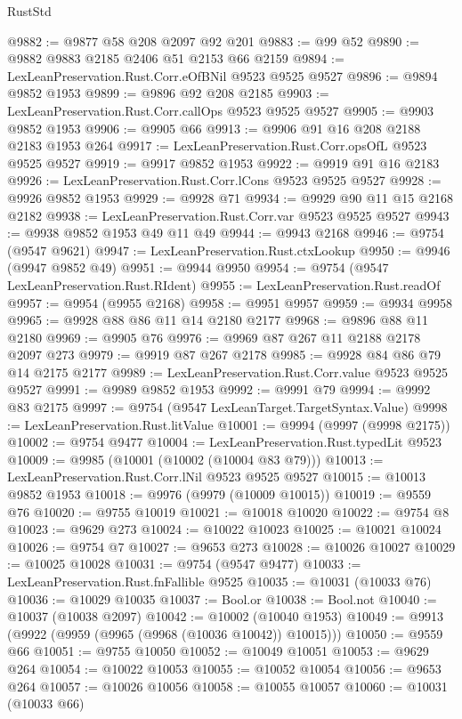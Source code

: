 \begin{lexlean}{RustStd}
\begin{coremodule}
@9882 := @9877 @58 @208 @2097 @92 @201
@9883 := @99 @52
@9890 := @9882 @9883 @2185 @2406 @51 @2153 @66 @2159
@9894 := LexLeanPreservation.Rust.Corr.eOfBNil @9523 @9525 @9527
@9896 := @9894 @9852 @1953
@9899 := @9896 @92 @208 @2185
@9903 := LexLeanPreservation.Rust.Corr.callOps @9523 @9525 @9527
@9905 := @9903 @9852 @1953
@9906 := @9905 @66
@9913 := @9906 @91 @16 @208 @2188 @2183 @1953 @264
@9917 := LexLeanPreservation.Rust.Corr.opsOfL @9523 @9525 @9527
@9919 := @9917 @9852 @1953
@9922 := @9919 @91 @16 @2183
@9926 := LexLeanPreservation.Rust.Corr.lCons @9523 @9525 @9527
@9928 := @9926 @9852 @1953
@9929 := @9928 @71
@9934 := @9929 @90 @11 @15 @2168 @2182
@9938 := LexLeanPreservation.Rust.Corr.var @9523 @9525 @9527
@9943 := @9938 @9852 @1953 @49 @11 @49
@9944 := @9943 @2168
@9946 := @9754 (@9547 @9621)
@9947 := LexLeanPreservation.Rust.ctxLookup
@9950 := @9946 (@9947 @9852 @49)
@9951 := @9944 @9950
@9954 := @9754 (@9547 LexLeanPreservation.Rust.RIdent)
@9955 := LexLeanPreservation.Rust.readOf
@9957 := @9954 (@9955 @2168)
@9958 := @9951 @9957
@9959 := @9934 @9958
@9965 := @9928 @88 @86 @11 @14 @2180 @2177
@9968 := @9896 @88 @11 @2180
@9969 := @9905 @76
@9976 := @9969 @87 @267 @11 @2188 @2178 @2097 @273
@9979 := @9919 @87 @267 @2178
@9985 := @9928 @84 @86 @79 @14 @2175 @2177
@9989 := LexLeanPreservation.Rust.Corr.value @9523 @9525 @9527
@9991 := @9989 @9852 @1953
@9992 := @9991 @79
@9994 := @9992 @83 @2175
@9997 := @9754 (@9547 LexLeanTarget.TargetSyntax.Value)
@9998 := LexLeanPreservation.Rust.litValue
@10001 := @9994 (@9997 (@9998 @2175))
@10002 := @9754 @9477
@10004 := LexLeanPreservation.Rust.typedLit @9523
@10009 := @9985 (@10001 (@10002 (@10004 @83 @79)))
@10013 := LexLeanPreservation.Rust.Corr.lNil @9523 @9525 @9527
@10015 := @10013 @9852 @1953
@10018 := @9976 (@9979 (@10009 @10015))
@10019 := @9559 @76
@10020 := @9755 @10019
@10021 := @10018 @10020
@10022 := @9754 @8
@10023 := @9629 @273
@10024 := @10022 @10023
@10025 := @10021 @10024
@10026 := @9754 @7
@10027 := @9653 @273
@10028 := @10026 @10027
@10029 := @10025 @10028
@10031 := @9754 (@9547 @9477)
@10033 := LexLeanPreservation.Rust.fnFallible @9525
@10035 := @10031 (@10033 @76)
@10036 := @10029 @10035
@10037 := Bool.or
@10038 := Bool.not
@10040 := @10037 (@10038 @2097)
@10042 := @10002 (@10040 @1953)
@10049 := @9913 (@9922 (@9959 (@9965 (@9968 (@10036 @10042)) @10015)))
@10050 := @9559 @66
@10051 := @9755 @10050
@10052 := @10049 @10051
@10053 := @9629 @264
@10054 := @10022 @10053
@10055 := @10052 @10054
@10056 := @9653 @264
@10057 := @10026 @10056
@10058 := @10055 @10057
@10060 := @10031 (@10033 @66)

\end{coremodule}
\end{lexlean}
